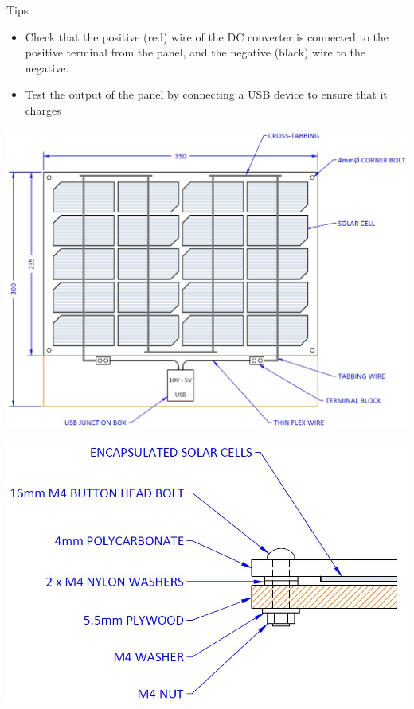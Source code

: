 \documentclass{article}
\theoremstyle{definition}
\theoremstyle{definition}
\theoremstyle{remark}
\begin{document}
    Tips

    \begin{itemize}
      \item Check that the positive (red) wire of the DC converter is connected to the positive terminal from the panel, and the negative (black) wire to the negative.
      \item Test the output of the panel by connecting a USB device to ensure that it charges
    \end{itemize}

    \begin{center}
      \includegraphics[width=0.8\paperwidth]{Images/image_3_19_(topdown_diagram).png}
    \end{center}

    \begin{center}
      \includegraphics[width=0.4\paperwidth]{Images/image_3_20_(sideview_diagram).png}
    \end{center}
  
\end{document}
